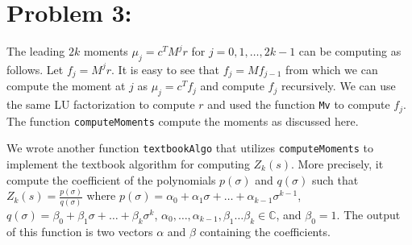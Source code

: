 
\section*{Problem 3:}

The leading $2k$ moments $\mu_{j} = c^{T}M^{j}r$ for $j=0,1,\dots, 2k-1$ can be computing as follows. Let $f_{j} = M^{j}r$. It is easy to see that $f_{j} = Mf_{j-1}$ from which we can compute the moment at $j$ as $\mu_{j}=c^{T}f_{j}$ and compute $f_{j}$ recursively. We can use the same LU factorization to compute $r$ and used the function \texttt{Mv} to compute $f_{j}$. The function \texttt{computeMoments} compute the moments as discussed here. 

We wrote another function \texttt{textbookAlgo} that utilizes \texttt{computeMoments} to implement the textbook algorithm for computing $Z_{k}(s)$. More precisely, it compute the coefficient of the polynomials $p(\sigma)$  and $q(\sigma)$ such that $Z_{k}(s) = \frac{p(\sigma)}{q(\sigma)}$ where $p(\sigma)= \alpha_{0} + \alpha_{1} \sigma + \dots + \alpha_{k-1}\sigma^{k-1}$, $q(\sigma)= \beta_{0} + \beta_{1} \sigma + \dots + \beta_{k}\sigma^{k}$, $\alpha_{0}, \dots, \alpha_{k-1}, \beta_{1}\dots \beta_{k}\in \mathbb{C}$, and $\beta_{0}=1$. The output of this function is two vectors $\alpha$ and $\beta$ containing the coefficients. 


